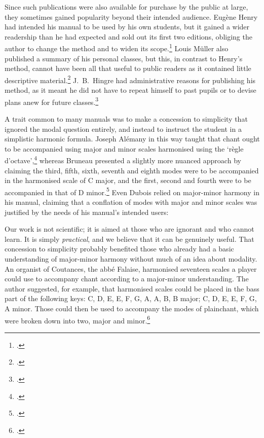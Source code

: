 Since such publications were also available for purchase by the public at large, they sometimes gained popularity beyond their intended audience.
%
Eugène Henry had intended his manual to be used by his own students, but it gained a wider readership than he had expected and sold out its first two editions, obliging the author to change the method and to widen its scope.\footcite[unpaginated `Avertissement de l'auteur']{HenryMethodepouraccompagner1889}
Louis Müller also published a summary of his personal classes, but this, in contrast to Henry's method, cannot have been all that useful to public readers as it contained little descriptive material.\footcite[unpaginated preface  col.~1]{MullerPetittraiteharmonie1880}
J.~B.~Hingre had administrative reasons for publishing his method, as it meant he did not have to repeat himself to past pupils or to devise plans anew for future classes.\footcite[3]{HingreMethodeaccompagnementplainchant}

A trait common to many manuals was to make a concession to simplicity that ignored the modal question entirely, and instead to instruct the student in a simplistic harmonic formula.
Joseph Alémany in this way taught that chant ought to be accompanied using major and minor scales harmonised using the `règle d'octave',\footcite[19]{AlemanyMethodesimplefacile1862} whereas Bruneau presented a slightly more nuanced approach by claiming the third, fifth, sixth, seventh and eighth modes were to be accompanied in the harmonised scale of C major, and the first, second and fourth were to be accompanied in that of D minor.\footcite[p.~v]{BruneauMethodesimplefacile1856}
%
Even Dubois relied on major-minor harmony in his manual, claiming that a conflation of modes with major and minor scales was justified by the needs of his manual's intended users:

  {\cite[1]{DuboisAccompagnementpratiqueplainchant1884}}
{Our work is not scientific; it is aimed at those who are ignorant and who cannot learn. It is simply \emph{practical}, and we believe that it can be genuinely useful.}
\noindent
That concession to simplicity probably benefited those who already had a basic understanding of major-minor harmony without much of an idea about modality.
An organist of Coutances, the abbé Falaise, harmonised seventeen scales a player could use to accompany chant according to a major-minor understanding.
The author suggested, for example, that harmonised scales could be placed in the bass part of the following keys: C, D, E\kern 1pt\flat{}, E, F, G, A\kern 1pt\flat{}, A, B\kern 1pt\flat{}, B major; C, D, E\kern 1pt\flat{}, E, F, G, A minor.
Those could then be used to accompany the modes of plainchant, which were broken down into two, major and minor.\footcite[85--104]{FalaiseMethodetheoriquepratique1876}

